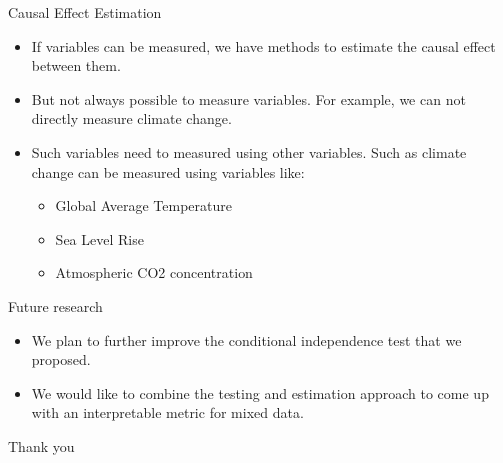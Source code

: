 \documentclass[aspectratio=169]{beamer}
\begin{document}
\begin{frame}{Causal Effect Estimation}

	\begin{itemize}
		\item If variables can be measured, we have methods to estimate the causal effect between them.
		\item But not always possible to measure variables. For example, we can not directly measure climate change.
		\item Such variables need to measured using other variables. Such as climate change can be measured using variables like:
			\begin{itemize}
				\item Global Average Temperature
				\item Sea Level Rise
				\item Atmospheric CO2 concentration
			\end{itemize}
	\end{itemize}

\end{frame}

\begin{frame}{Future research}
	\begin{itemize}
		\item We plan to further improve the conditional independence test that we proposed.
		\item We would like to combine the testing and estimation approach to come up with an interpretable metric for mixed data.
	\end{itemize}
\end{frame}

\begin{frame}
	\Huge{Thank you}
\end{frame}
\end{document}

